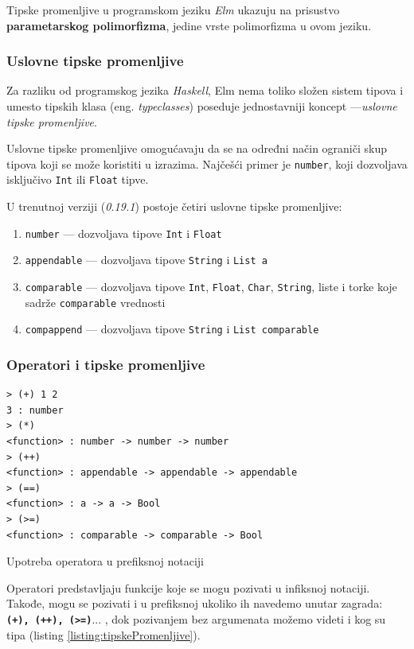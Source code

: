 \documentclass[12pt,oneside]{memoir}
\begin{document}
Tipske promenljive u programskom jeziku \emph{Elm} ukazuju na prisustvo \textbf{parametarskog polimorfizma},
jedine vrste polimorfizma u ovom jeziku.

\subsubsection{Uslovne tipske promenljive}
Za razliku od programskog jezika \emph{Haskell}, Elm nema toliko složen sistem tipova i umesto tipskih 
klasa (eng. \emph{typeclasses})\cite{typeclasses} poseduje jednostavniji koncept
---\emph{uslovne tipske promenljive}. 

Uslovne tipske promenljive omogućavaju da se na određni način ograniči skup tipova
koji se može koristiti u izrazima. Najčešći primer je \texttt{number}, koji dozvoljava 
isključivo \texttt{Int} ili \texttt{Float} tipve. 

U trenutnoj verziji (\emph{0.19.1}) postoje četiri uslovne tipske promenljive:
\begin{enumerate}
  \item \texttt{number} --- dozvoljava tipove \texttt{Int} i \texttt{Float}
  \item \texttt{appendable} --- dozvoljava tipove \texttt{String} i \texttt{List a}
  \item \texttt{comparable} --- dozvoljava tipove \texttt{Int}, \texttt{Float}, \texttt{Char},
  \texttt{String}, liste i torke koje sadrže \texttt{comparable} vrednosti
  \item \texttt{compappend} --- dozvoljava tipove \texttt{String} i \texttt{List comparable}
\end{enumerate}
\subsubsection{Operatori i tipske promenljive}

\begin{listing}[h]
\begin{verbatim}
> (+) 1 2
3 : number
> (*)
<function> : number -> number -> number
> (++)
<function> : appendable -> appendable -> appendable
> (==)
<function> : a -> a -> Bool
> (>=)
<function> : comparable -> comparable -> Bool
\end{verbatim}
\caption{Upotreba operatora u prefiksnoj notaciji}
\label{listing:tipskePromenljive}
\end{listing}
Operatori predstavljaju funkcije koje se mogu pozivati u infiksnoj notaciji. Takođe, 
mogu se pozivati i u prefiksnoj ukoliko ih navedemo unutar zagrada: \texttt{\textbf{(+),
(++), (>=)}}... , dok pozivanjem bez argumenata možemo videti i kog su tipa (listing \ref{listing:tipskePromenljive}).
\end{document}
